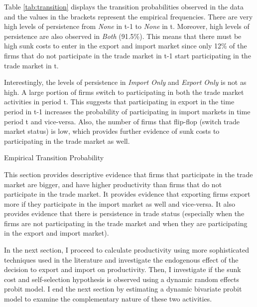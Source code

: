 \documentclass[12pt]{article}
\begin{document}
Table \ref{tab:transition} displays the transition probabilities
observed in the data  and the values in the brackets represent the
empirical frequencies.  There are very high levels of persistence from
\textit{None} in t-1 to \textit{None} in t. Moreover,   high levels of persistence
are also observed in  \textit{Both}  (91.5\%). This means that there must be high sunk
costs to enter in the export and import market since only 12\% of the
firms  that do not participate in the trade market in t-1 start
participating in the trade market in t.

Interestingly, the levels of
persistence in \textit{Import Only} and \textit{Export Only}  is not
as high. A large portion of firms switch to participating in both the trade market
activities in period t. This suggests that participating in export in the time
period in t-1 increases the probability of participating in import  markets in time period
t and vice-versa. Also, the number of firms that flip-flop (switch
trade market status) is low, which provides further evidence of sunk costs
to participating in the trade market as well. 

\begin{table}[H]
\begin{center}

\caption{Empirical Transition Probability}
\label{tab:transition}

\end{center}

\end{table}


This section provides descriptive evidence that firms that participate
in the trade market are bigger, and have higher
productivity than firms that do not participate in the trade
market. It provides evidence that exporting firms export more if they
participate in the import market as well and vice-versa. It also
provides evidence that there is persistence in trade status
(especially when the firms are not participating in the trade market
and when they are participating in the export and import market). 

In the next section, I proceed to calculate productivity using more
sophisticated techniques used in the literature and investigate the endogenous effect
of the decision to export and import on productivity. Then, I investigate if the
sunk cost and self-selection hypothesis is observed using a
dynamic random effects probit model. I end the next section by
estimating a dynamic bivariate probit model to examine the complementary
nature of these two activities. 
\end{document}
